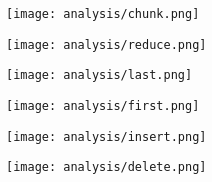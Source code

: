 \begin{multicols}{2}
\begin{center}
\texttt{[image: analysis/chunk.png]} 
\end{center}
\columnbreak
\begin{center}
\texttt{[image: analysis/reduce.png]} 
\end{center}
\end{multicols}

\begin{multicols}{2}
\begin{center}
\texttt{[image: analysis/last.png]} 
\end{center}
\columnbreak
\begin{center}
\texttt{[image: analysis/first.png]} 
\end{center}
\end{multicols}

\begin{multicols}{2}
\begin{center}
\texttt{[image: analysis/insert.png]} 
\end{center}
\columnbreak
\begin{center}
\texttt{[image: analysis/delete.png]} 
\end{center}
\end{multicols}

